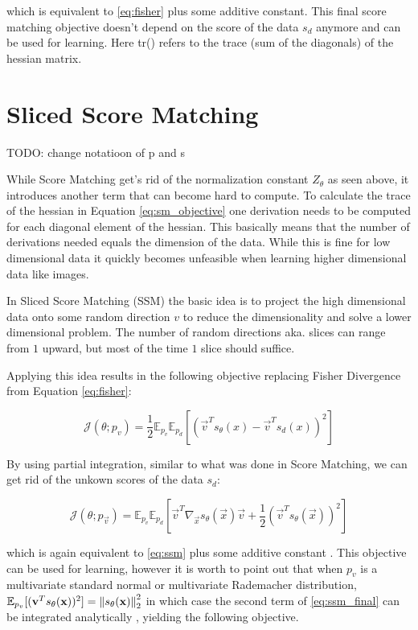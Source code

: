 which is equivalent to \ref{eq:fisher} plus some additive constant. This final score matching objective doesn't depend on the score of the data $s_d$ anymore and can be used for learning. Here tr() refers to the
trace (sum of the diagonals) of the hessian matrix.

\section{Sliced Score Matching}
\label{sec:ssm}

TODO: change notatioon of p and s

While Score Matching get's rid of the normalization constant $Z_\theta$ as seen above, it introduces another term that can become hard
to compute. To calculate the trace of the hessian in Equation \ref{eq:sm_objective} one derivation needs to be computed for each diagonal element of the hessian.
This basically means that the number of derivations needed equals the dimension of the data. 
While this is fine for low dimensional data it quickly becomes unfeasible when
learning higher dimensional data like images.  

In Sliced Score Matching (SSM) \cite{ssm} the basic idea is to project the high dimensional data onto some random direction $v$ to reduce 
the dimensionality and solve a lower dimensional problem. The number of random directions aka. slices can range from $1$ upward, but 
most of the time $1$ slice should suffice. 

Applying this idea results in the following objective replacing Fisher Divergence from Equation \ref{eq:fisher}: 

\begin{equation}
    \label{eq:ssm}
    \mathcal{J}(\theta; p_v) = \frac{1}{2} \mathbb{E}_{p_v} \mathbb{E}_{p_d} \left[ \left( \vec{v}^T s_\theta(x) - \vec{v}^T s_d(x) \right)^2 \right]
\end{equation}

By using partial integration, similar to what was done in Score Matching, we can get rid of the unkown scores of the data $s_d$:

\begin{equation}
    \label{eq:ssm_final}
    \mathcal{J}(\theta; p_\vec{v}) = \mathbb{E}_{p_v} \mathbb{E}_{p_d} \left[ \vec{v}^T \nabla_\vec{x} s_\theta(\vec{x}) \vec{v} + \frac{1}{2} \left( \vec{v}^T s_\theta(\vec{x}) \right)^2 \right]
\end{equation}

which is again equivalent to \ref{eq:ssm} plus some additive constant \cite{ssm}. This objective can be used for learning, however
it is worth to point out that when $p_v$ is a multivariate standard normal or multivariate Rademacher distribution, 
$\mathbb{E}_{p_v} [ ( \textbf{v}^T s_\theta(\textbf{x}) )^2 ] = \left\lVert s_\theta(\textbf{x})\right\rVert_2^2$ in which case the second term 
of \ref{eq:ssm_final} can be integrated analytically \cite{ssm}, yielding the following objective.

